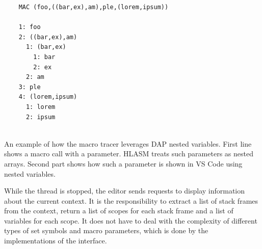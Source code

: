 \begin{listing}
	
	\begin{verbatim}
	MAC (foo,((bar,ex),am),ple,(lorem,ipsum))
	
	1: foo
	2: ((bar,ex),am)
	  1: (bar,ex)
	    1: bar
	    2: ex
	  2: am
	3: ple
	4: (lorem,ipsum)
	  1: lorem
	  2: ipsum
	
	\end{verbatim}
	\caption{An example of how the macro tracer leverages DAP nested variables. First line shows a macro call with a parameter. HLASM treats such parameters as nested arrays. Second part shows how such a parameter is shown in VS Code using nested variables.}
	\label{dap_nested_variables}
\end{listing}

While the thread is stopped, the editor sends requests to display information about the current context. It is the  responsibility to extract a list of stack frames from the context, return a list of scopes for each stack frame and a list of variables for each scope. It does not have to deal with the complexity of different types of set symbols and macro parameters, which is done by the implementations of the  interface.


